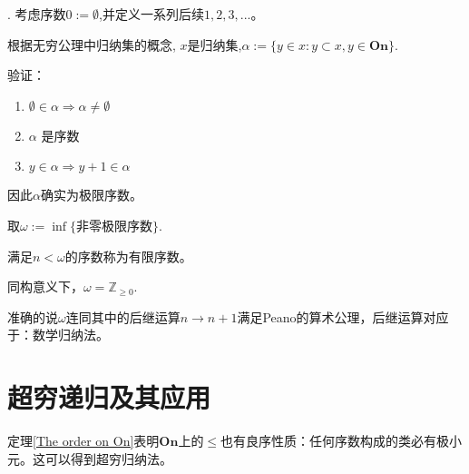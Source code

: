 \begin{Exap}.
    考虑序数$0:=\emptyset$,并定义一系列后续$1,2,3,...$。

    根据无穷公理中归纳集的概念, $x$是归纳集,$\alpha :=\{y\in x:y \subset x, y\in \mathbf{On}\}$.

    验证：
    \begin{enumerate}
        \item $\emptyset \in \alpha \Rightarrow \alpha \neq \emptyset$
        \item $\alpha$ 是序数
        \item $y\in \alpha \Rightarrow y+1 \in \alpha$
    \end{enumerate}
    因此$\alpha$确实为极限序数。
    
    取$\omega:=\inf\{\text{非零极限序数}\}$.

    满足$n<\omega$的序数称为有限序数。
\end{Exap}

    同构意义下，$\omega = \mathbb{Z}_{\geq 0} $. 
    
    准确的说$\omega$连同其中的后继运算$n\rightarrow n+1$满足Peano的算术公理，后继运算对应于：数学归纳法。

\section{超穷递归及其应用}

定理\ref{The order on On}表明$\mathbf{On}$上的$\leq $也有良序性质：任何序数构成的类必有极小元。这可以得到超穷归纳法。

